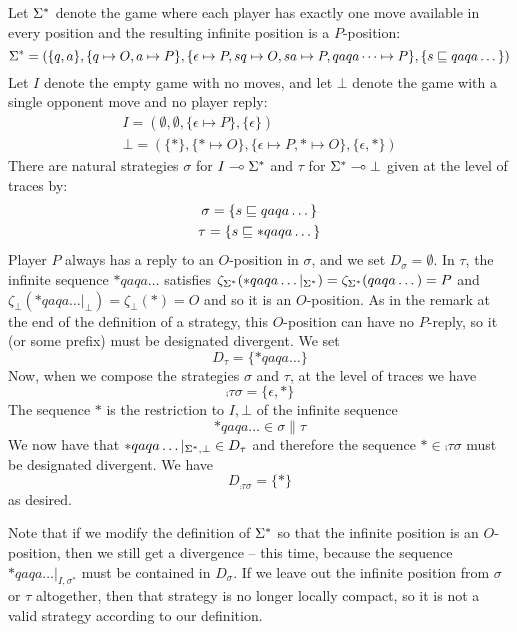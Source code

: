 \documentclass{article}
\begin{document}
\begin{example}
  Let ${\Sigma^*}$ denote the game where each player has exactly one move available in every position and the resulting infinite position is a $P$-position:
  \[
    {\Sigma^*} = (\{q, a\}, \{q\mapsto O, a\mapsto P\}, \{\epsilon\mapsto P,sq\mapsto O,sa\mapsto P,qaqa\dots\mapsto P\}, \{s\sqsubseteq qaqa\dots\})
    \]
  Let $I$ denote the empty game with no moves, and let $\bot$ denote the game with a single opponent move and no player reply:
  \begin{gather*}
    I = (\emptyset, \emptyset, \{\epsilon\mapsto P\}, \{\epsilon\}) \\
    \bot = (\{*\}, \{*\mapsto O\}, \{\epsilon\mapsto P, *\mapsto O\}, \{\epsilon, *\})
  \end{gather*}
  There are natural strategies $\sigma$ for $I\multimap{\Sigma^*}$ and $\tau$ for ${\Sigma^*}\multimap\bot$ given at the level of traces by:
  \begin{gather*}
    \sigma = \{s \sqsubseteq qaqa\dots\} \\
    \tau = \{s \sqsubseteq *qaqa\dots\}
  \end{gather*}
  Player $P$ always has a reply to an $O$-position in $\sigma$, and we set $D_\sigma = \emptyset$.  In $\tau$, the infinite sequence $*qaqa\dots$ satisfies $\zeta_{{\Sigma^*}}(*qaqa\dots\vert_{{\Sigma^*}}) = \zeta_{{\Sigma^*}}(qaqa\dots) = P$ and $\zeta_{\bot}(*qaqa\dots\vert_{\bot}) = \zeta_{\bot}(*) = O$ and so it is an $O$-position.  As in the remark at the end of the definition of a strategy, this $O$-position can have no $P$-reply, so it (or some prefix) must be designated divergent.  We set
  \[
    D_\tau = \{*qaqa\dots\}
    \]
  Now, when we compose the strategies $\sigma$ and $\tau$, at the level of traces we have
  \[
    \comp\tau\sigma = \{\epsilon, *\}
    \]
  The sequence $*$ is the restriction to $I,\bot$ of the infinite sequence
  \[
    *qaqa\dots \in \sigma\|\tau
    \]
  We now have that $*qaqa\dots\vert_{{\Sigma^*},\bot}\in D_\tau$ and therefore the sequence $*\in\comp\tau\sigma$ must be designated divergent.  We have
  \[
    D_{\comp\tau\sigma} = \{*\}
    \]
  as desired.

  Note that if we modify the definition of ${\Sigma^*}$ so that the infinite position is an $O$-position, then we still get a divergence -- this time, because the sequence $*qaqa\dots\vert_{I,\sigma^*}$ must be contained in $D_\sigma$.  If we leave out the infinite position from $\sigma$ or $\tau$ altogether, then that strategy is no longer locally compact, so it is not a valid strategy according to our definition.
\end{example}
\end{document}
